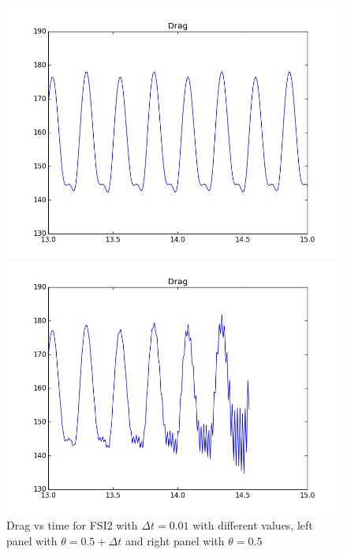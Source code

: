 \begin{figure}[H]
\begin{minipage}[t][7cm][t]{0.49\linewidth}
    \includegraphics[scale=0.36]{./Temporal_stability/FSI2_001_051_small.png} 
    \vspace{4ex}
  \end{minipage}%
  \begin{minipage}[t][7cm][t]{0.5\linewidth}
    \centering
    \includegraphics[scale=0.36]{./Temporal_stability/FSI2_001_050_small.png} 
    \vspace{4ex}
  \end{minipage} 
\caption {Drag vs time for FSI2 with $\Delta t = 0.01$ with different values, left panel with $\theta=0.5 + \Delta t$ and right panel with $\theta = 0.5$ }
\label{fig:FSI2drag_plots} 
\end{figure}

